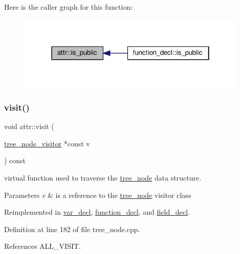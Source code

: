 Here is the caller graph for this function\+:
\nopagebreak
\begin{figure}[H]
\begin{center}
\leavevmode
\includegraphics[width=310pt]{dc/de4/structattr_a413e673300e8b18f23026cf752d22bed_icgraph}
\end{center}
\end{figure}
\mbox{\label{structattr_a75ba987f0d5d6b50e0aee15d25b98a5b}} 
\subsubsection{\texorpdfstring{visit()}{visit()}}
{\footnotesize\ttfamily void attr\+::visit (\begin{DoxyParamCaption}\item[{\hyperlink{classtree__node__visitor}{tree\+\_\+node\+\_\+visitor} $\ast$const}]{v }\end{DoxyParamCaption}) const\hspace{0.3cm}{\ttfamily [virtual]}}



virtual function used to traverse the \hyperlink{classtree__node}{tree\+\_\+node} data structure. 


\begin{DoxyParams}{Parameters}
{\em v} & is a reference to the \hyperlink{classtree__node}{tree\+\_\+node} visitor class \\
\hline
\end{DoxyParams}


Reimplemented in \hyperlink{structvar__decl_ad28f066d3483ec9ca4b7839c1af19c6f}{var\+\_\+decl}, \hyperlink{structfunction__decl_a49389fd3c1df13bb78dbc94e7350462e}{function\+\_\+decl}, and \hyperlink{structfield__decl_a68ef82bb50b2ebdaa89d1702aa01065e}{field\+\_\+decl}.



Definition at line 182 of file tree\+\_\+node.\+cpp.



References A\+L\+L\+\_\+\+V\+I\+S\+IT.



